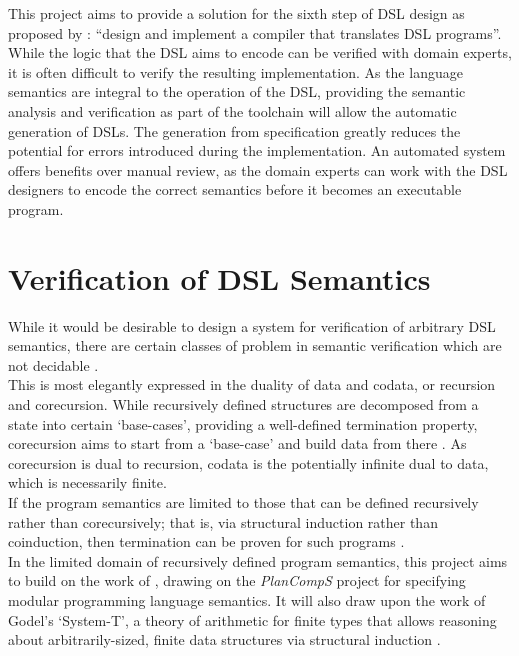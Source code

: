 This project aims to provide a solution for the sixth step of DSL design as proposed by \cite{van2000domain}: ``design and implement a compiler that translates DSL programs''. 
While the logic that the DSL aims to encode can be verified with domain experts, it is often difficult to verify the resulting implementation.
As the language semantics are integral to the operation of the DSL, providing the semantic analysis and verification as part of the toolchain will allow the automatic generation of DSLs.
The generation from specification greatly reduces the potential for errors introduced during the implementation.
An automated system offers benefits over manual review, as the domain experts can work with the DSL designers to encode the correct semantics before it becomes an executable program.


\section{Verification of DSL Semantics} %
\label{sec:verification_of_dsl_semantics}
While it would be desirable to design a system for verification of arbitrary DSL semantics, there are certain classes of problem in semantic verification which are not decidable \citep{abdulla1994undecidable}. \\

This is most elegantly expressed in the duality of data and codata, or recursion and corecursion. 
While recursively defined structures are decomposed from a state into certain `base-cases', providing a well-defined termination property, corecursion aims to start from a `base-case' and build data from there \citep{hinze2010reasoning}.
As corecursion is dual to recursion, codata is the potentially infinite dual to data, which is necessarily finite. \\

If the program semantics are limited to those that can be defined recursively rather than corecursively; that is, via structural induction rather than coinduction, then termination can be proven for such programs \citep{nordstrom1988terminating}.\\

In the limited domain of recursively defined program semantics, this project aims to build on the work of \cite{doh2001composing}, drawing on the \textit{PlanCompS} project for specifying modular programming language semantics.
It will also draw upon the work of Godel's `System-T', a theory of arithmetic for finite types that allows reasoning about arbitrarily-sized, finite data structures via structural induction \cite{girard1989proofs,alves2010godel}.\\


